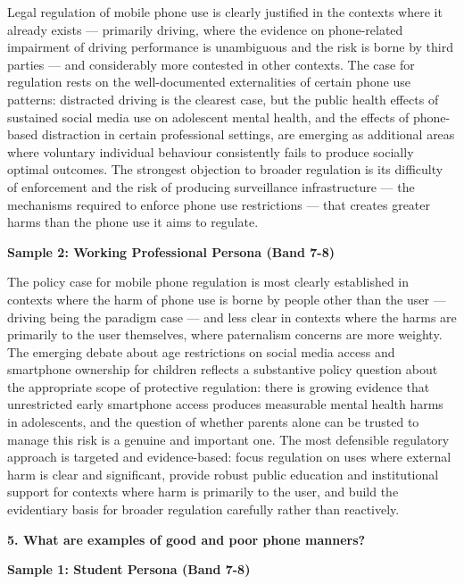 Legal regulation of mobile phone use is clearly justified in the contexts where it already exists — primarily driving, where the evidence on phone-related impairment of driving performance is unambiguous and the risk is borne by third parties — and considerably more contested in other contexts. The case for regulation rests on the well-documented externalities of certain phone use patterns: distracted driving is the clearest case, but the public health effects of sustained social media use on adolescent mental health, and the effects of phone-based distraction in certain professional settings, are emerging as additional areas where voluntary individual behaviour consistently fails to produce socially optimal outcomes. The strongest objection to broader regulation is its difficulty of enforcement and the risk of producing surveillance infrastructure — the mechanisms required to enforce phone use restrictions — that creates greater harms than the phone use it aims to regulate.

\textbf{Sample 2: Working Professional Persona (Band 7-8)}

The policy case for mobile phone regulation is most clearly established in contexts where the harm of phone use is borne by people other than the user — driving being the paradigm case — and less clear in contexts where the harms are primarily to the user themselves, where paternalism concerns are more weighty. The emerging debate about age restrictions on social media access and smartphone ownership for children reflects a substantive policy question about the appropriate scope of protective regulation: there is growing evidence that unrestricted early smartphone access produces measurable mental health harms in adolescents, and the question of whether parents alone can be trusted to manage this risk is a genuine and important one. The most defensible regulatory approach is targeted and evidence-based: focus regulation on uses where external harm is clear and significant, provide robust public education and institutional support for contexts where harm is primarily to the user, and build the evidentiary basis for broader regulation carefully rather than reactively.

\separator

\begin{ieltsquestion}
\textbf{5. What are examples of good and poor phone manners?}
\end{ieltsquestion}
\textbf{Sample 1: Student Persona (Band 7-8)}

